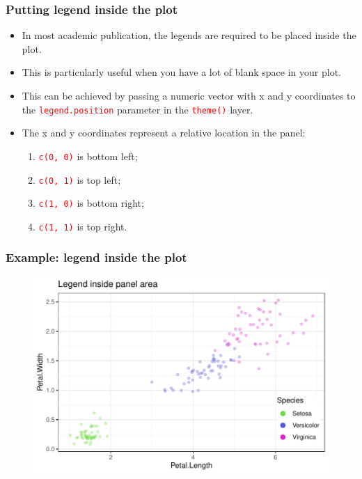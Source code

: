 \documentclass{beamer}
\begin{document}
\begin{frame}\frametitle{Putting legend inside the plot}
\begin{itemize}
\item In most academic publication, the legends are required to be placed inside the plot.

\vspace{0.15in}

\item<2-> This is particularly useful when you have a lot of blank space in your plot.
\vspace{0.15in}

\item<3-> This can be achieved by passing a numeric vector with x and y coordinates to the \texttt{\textcolor{red}{legend.position}} parameter in the \texttt{\textcolor{red}{theme()}} layer.
\vspace{0.15in}

\item<4-> The x and y coordinates represent a relative location in the panel: 
\begin{enumerate}
\item \texttt{\textcolor{red}{c(0, 0)}} is bottom left;
\item \texttt{\textcolor{red}{c(0, 1)}} is top left;
\item \texttt{\textcolor{red}{c(1, 0)}} is bottom right;
\item \texttt{\textcolor{red}{c(1, 1)}} is top right.
\end{enumerate}
\end{itemize}
\end{frame}

\begin{frame}\frametitle{Example: legend inside the plot}
\begin{figure}
\includegraphics[width=0.99\linewidth]{PlotsLec3/LegPosInside}
\end{figure}
\end{frame}
\end{document}
